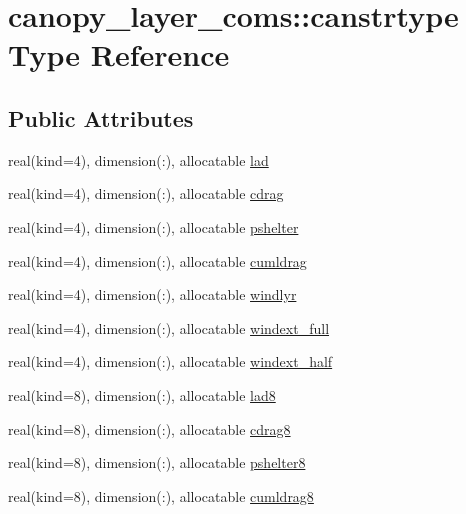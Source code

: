 \hypertarget{structcanopy__layer__coms_1_1canstrtype}{}\section{canopy\+\_\+layer\+\_\+coms\+:\+:canstrtype Type Reference}
\label{structcanopy__layer__coms_1_1canstrtype}
\subsection*{Public Attributes}
\begin{DoxyCompactItemize}
\item 
real(kind=4), dimension(\+:), allocatable \hyperlink{structcanopy__layer__coms_1_1canstrtype_a99d989c9346612d9ed3498934bbeadd4}{lad}
\item 
real(kind=4), dimension(\+:), allocatable \hyperlink{structcanopy__layer__coms_1_1canstrtype_a5ae1b10bcffa38619368cfa76a022c4e}{cdrag}
\item 
real(kind=4), dimension(\+:), allocatable \hyperlink{structcanopy__layer__coms_1_1canstrtype_a6c8be2f5c16677cdcfb2bc560fc887e8}{pshelter}
\item 
real(kind=4), dimension(\+:), allocatable \hyperlink{structcanopy__layer__coms_1_1canstrtype_affa32f59db639149948370654c88a4a8}{cumldrag}
\item 
real(kind=4), dimension(\+:), allocatable \hyperlink{structcanopy__layer__coms_1_1canstrtype_a16bdb255323c8c033f924e1a658d7f4f}{windlyr}
\item 
real(kind=4), dimension(\+:), allocatable \hyperlink{structcanopy__layer__coms_1_1canstrtype_a890e85105bf5602e033bd495163dfd95}{windext\+\_\+full}
\item 
real(kind=4), dimension(\+:), allocatable \hyperlink{structcanopy__layer__coms_1_1canstrtype_a5922bffa2e8f10f4a9a793ce9839d1c0}{windext\+\_\+half}
\item 
real(kind=8), dimension(\+:), allocatable \hyperlink{structcanopy__layer__coms_1_1canstrtype_a0503242268b40f38ae54514881bc9259}{lad8}
\item 
real(kind=8), dimension(\+:), allocatable \hyperlink{structcanopy__layer__coms_1_1canstrtype_a3a3de790a580c68fd8a4f826c5f3f315}{cdrag8}
\item 
real(kind=8), dimension(\+:), allocatable \hyperlink{structcanopy__layer__coms_1_1canstrtype_a7beb4d8d6dd532beae62c7095937448d}{pshelter8}
\item 
real(kind=8), dimension(\+:), allocatable \hyperlink{structcanopy__layer__coms_1_1canstrtype_ad6ac4933d51106d1090d2adaea062402}{cumldrag8}

\end{DoxyCompactItemize}
